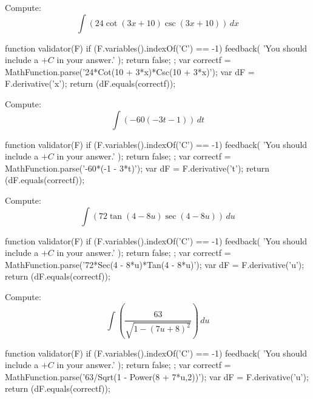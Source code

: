 \documentclass{ximera}
\renewcommand{\d}{\, d}
\begin{document}
\begin{exercise}
Compute: 
\[
\int \left(24 \cot (3 x+10) \csc (3 x+10)\right)\d x
\]
\begin{expressionAnswer}
     function validator(F) {
      if (F.variables().indexOf('C') == -1) {
        feedback( 'You should include a $+C$ in your answer.' );
        return false;
      };      
      var correctf = MathFunction.parse('24*Cot(10 + 3*x)*Csc(10 + 3*x)');
      var dF = F.derivative('x');
      return (dF.equals(correctf));
    }
\end{expressionAnswer}
\end{exercise}



\begin{exercise}
Compute: 
\[
\int \left(-60 (-3 t-1)\right)\d t
\]
\begin{expressionAnswer}
     function validator(F) {
      if (F.variables().indexOf('C') == -1) {
        feedback( 'You should include a $+C$ in your answer.' );
        return false;
      };      
      var correctf = MathFunction.parse('-60*(-1 - 3*t)');
      var dF = F.derivative('t');
      return (dF.equals(correctf));
    }
\end{expressionAnswer}
\end{exercise}



\begin{exercise}
Compute: 
\[
\int \left(72 \tan (4-8 u) \sec (4-8 u)\right)\d u
\]
\begin{expressionAnswer}
     function validator(F) {
      if (F.variables().indexOf('C') == -1) {
        feedback( 'You should include a $+C$ in your answer.' );
        return false;
      };      
      var correctf = MathFunction.parse('72*Sec(4 - 8*u)*Tan(4 - 8*u)');
      var dF = F.derivative('u');
      return (dF.equals(correctf));
    }
\end{expressionAnswer}
\end{exercise}



\begin{exercise}
Compute: 
\[
\int \left(\frac{63}{\sqrt{1-(7 u+8)^2}}\right)\d u
\]
\begin{expressionAnswer}
     function validator(F) {
      if (F.variables().indexOf('C') == -1) {
        feedback( 'You should include a $+C$ in your answer.' );
        return false;
      };      
      var correctf = MathFunction.parse('63/Sqrt(1 - Power(8 + 7*u,2))');
      var dF = F.derivative('u');
      return (dF.equals(correctf));
    }
\end{expressionAnswer}
\end{exercise}
\end{document}
